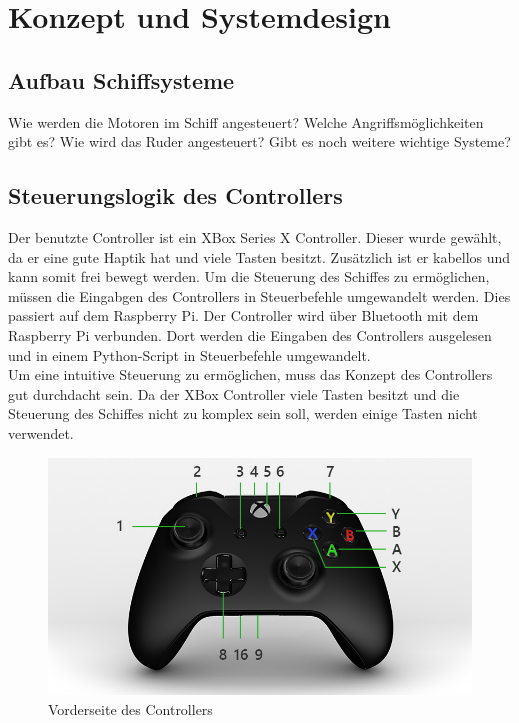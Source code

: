 \chapter{Konzept und Systemdesign}

\section{Aufbau Schiffsysteme}
Wie werden die Motoren im Schiff angesteuert?
Welche Angriffsmöglichkeiten gibt es?
Wie wird das Ruder angesteuert?
Gibt es noch weitere wichtige Systeme?

\section{Steuerungslogik des Controllers}
Der benutzte Controller ist ein XBox Series X Controller. Dieser wurde gewählt, da er eine gute Haptik hat und 
viele Tasten besitzt. Zusätzlich ist er kabellos und kann somit frei bewegt werden. Um die Steuerung des Schiffes zu
ermöglichen, müssen die Eingabgen des Controllers in Steuerbefehle umgewandelt werden. Dies passiert auf dem 
Raspberry Pi. Der Controller wird über Bluetooth mit dem Raspberry Pi verbunden. Dort werden die Eingaben des Controllers
ausgelesen und in einem Python-Script in Steuerbefehle umgewandelt. \\
Um eine intuitive Steuerung zu ermöglichen, muss das Konzept des Controllers gut durchdacht sein.
Da der XBox Controller viele Tasten besitzt und die Steuerung des Schiffes nicht zu komplex sein soll,
werden einige Tasten nicht verwendet. 
\begin{figure}[H]
    \centering
    \includegraphics[scale=0.5]{images/vorderseite.jpg}
    \caption{Vorderseite des Controllers}
    \label{fig:vorderseite}
\end{figure}


